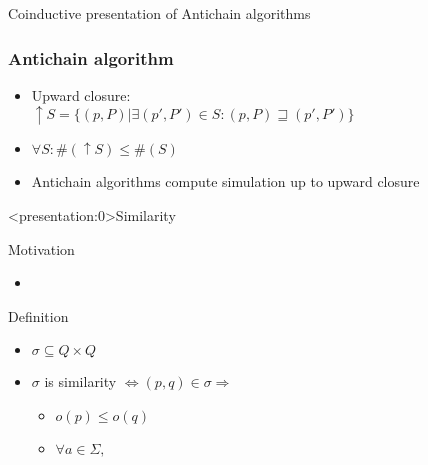 \documentclass[compress]{beamer}
\begin{document}
\begin{frame}{Coinductive presentation of Antichain algorithms}
  \frametitle{Antichain algorithm}
  \begin{itemize}
    \item Upward closure: \\
    $\uparrow S = \{ (p, P) | \exists (p', P') \in S: (p, P) \sqsupseteq (p', P')\}$
    \item $\forall S: \#(\uparrow S) \leq \#(S)$
    \item Antichain algorithms compute simulation up to upward closure
  \end{itemize}
\end{frame}

\begin{frame}<presentation:0>{Similarity}
  \begin{block}{Motivation}
    \begin{itemize}
      \item
    \end{itemize}
  \end{block}

  \begin{block}{Definition}
    \begin{itemize}
      \item $\sigma \subseteq Q \times Q$
      \item $\sigma$ is similarity $\iff (p, q) \in \sigma \Rightarrow$
        \begin{itemize}
          \item $o(p) \leq o(q)$
          \item $\forall a \in \Sigma, $
        \end{itemize}
    \end{itemize}
  \end{block}
\end{frame}
\end{document}
